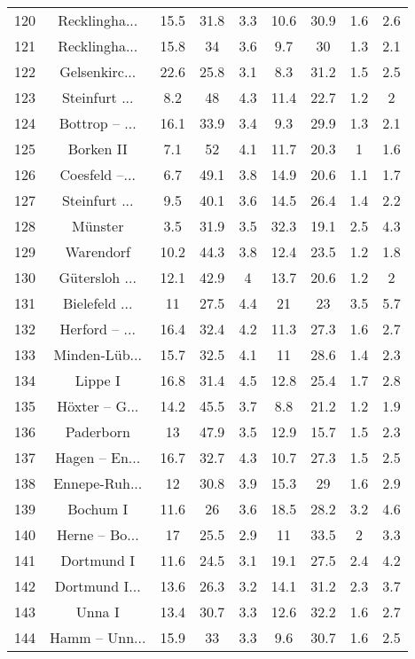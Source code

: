 \begin{table}[!htbp]
\begin{tabular}{@{\extracolsep{5pt}} ccccccccc}
120 & Recklingha... & 15.5 & 31.8 & 3.3 & 10.6 & 30.9 & 1.6 & 2.6 \\ 
121 & Recklingha... & 15.8 & 34 & 3.6 & 9.7 & 30 & 1.3 & 2.1 \\ 
122 & Gelsenkirc... & 22.6 & 25.8 & 3.1 & 8.3 & 31.2 & 1.5 & 2.5 \\ 
123 & Steinfurt ... & 8.2 & 48 & 4.3 & 11.4 & 22.7 & 1.2 & 2 \\ 
124 & Bottrop – ... & 16.1 & 33.9 & 3.4 & 9.3 & 29.9 & 1.3 & 2.1 \\ 
125 & Borken II & 7.1 & 52 & 4.1 & 11.7 & 20.3 & 1 & 1.6 \\ 
126 & Coesfeld –... & 6.7 & 49.1 & 3.8 & 14.9 & 20.6 & 1.1 & 1.7 \\ 
127 & Steinfurt ... & 9.5 & 40.1 & 3.6 & 14.5 & 26.4 & 1.4 & 2.2 \\ 
128 & Münster & 3.5 & 31.9 & 3.5 & 32.3 & 19.1 & 2.5 & 4.3 \\ 
129 & Warendorf & 10.2 & 44.3 & 3.8 & 12.4 & 23.5 & 1.2 & 1.8 \\ 
130 & Gütersloh ... & 12.1 & 42.9 & 4 & 13.7 & 20.6 & 1.2 & 2 \\ 
131 & Bielefeld ... & 11 & 27.5 & 4.4 & 21 & 23 & 3.5 & 5.7 \\ 
132 & Herford – ... & 16.4 & 32.4 & 4.2 & 11.3 & 27.3 & 1.6 & 2.7 \\ 
133 & Minden-Lüb... & 15.7 & 32.5 & 4.1 & 11 & 28.6 & 1.4 & 2.3 \\ 
134 & Lippe I & 16.8 & 31.4 & 4.5 & 12.8 & 25.4 & 1.7 & 2.8 \\ 
135 & Höxter – G... & 14.2 & 45.5 & 3.7 & 8.8 & 21.2 & 1.2 & 1.9 \\ 
136 & Paderborn & 13 & 47.9 & 3.5 & 12.9 & 15.7 & 1.5 & 2.3 \\ 
137 & Hagen – En... & 16.7 & 32.7 & 4.3 & 10.7 & 27.3 & 1.5 & 2.5 \\ 
138 & Ennepe-Ruh... & 12 & 30.8 & 3.9 & 15.3 & 29 & 1.6 & 2.9 \\ 
139 & Bochum I & 11.6 & 26 & 3.6 & 18.5 & 28.2 & 3.2 & 4.6 \\ 
140 & Herne – Bo... & 17 & 25.5 & 2.9 & 11 & 33.5 & 2 & 3.3 \\ 
141 & Dortmund I & 11.6 & 24.5 & 3.1 & 19.1 & 27.5 & 2.4 & 4.2 \\ 
142 & Dortmund I... & 13.6 & 26.3 & 3.2 & 14.1 & 31.2 & 2.3 & 3.7 \\ 
143 & Unna I & 13.4 & 30.7 & 3.3 & 12.6 & 32.2 & 1.6 & 2.7 \\ 
144 & Hamm – Unn... & 15.9 & 33 & 3.3 & 9.6 & 30.7 & 1.6 & 2.5 \\ 

\end{tabular}
\end{table}
